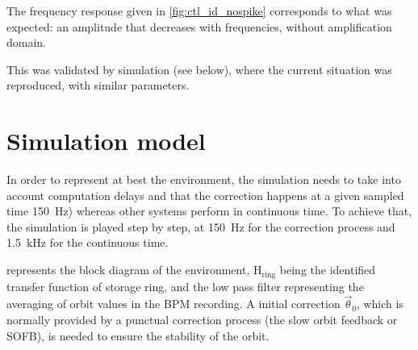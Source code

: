 The frequency response given in \cref{fig:ctl_id_nospike} corresponds to what was expected: an amplitude that decreases with frequencies, without amplification domain. 

This was validated by simulation (see below), where the current situation was reproduced, with similar parameters.

\section{Simulation model}
\label{sec:correction_simulation}

In order to represent at best the environment, the simulation needs to take into account computation delays and that the correction happens at a given sampled time \SI{150}{\hertz}) whereas other systems perform in continuous time. To achieve that, the simulation is played step by step, at \SI{150}{\hertz} for the correction process and \SI{1.5}{\kilo\hertz} for the continuous time.

 represents the block diagram of the environment, $\text{H}_\text{ring}$ being the identified transfer function of storage ring, and the low pass filter representing the averaging of orbit values in the BPM recording. A initial correction $\vec{\theta}_0$, which is normally provided by a punctual correction process (the slow orbit feedback or SOFB), is needed to ensure the stability of the orbit.

